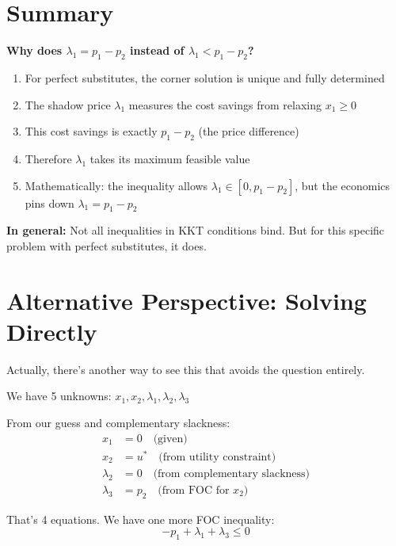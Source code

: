 \documentclass[11pt]{article}
\begin{document}
\section{Summary}

\begin{tcolorbox}[colback=blue!5!white,colframe=blue!75!black,title=The Bottom Line]

\textbf{Why does $\lambda_1 = p_1 - p_2$ instead of $\lambda_1 < p_1 - p_2$?}

\begin{enumerate}
\item For perfect substitutes, the corner solution is unique and fully determined
\item The shadow price $\lambda_1$ measures the cost savings from relaxing $x_1 \geq 0$
\item This cost savings is exactly $p_1 - p_2$ (the price difference)
\item Therefore $\lambda_1$ takes its maximum feasible value

\item Mathematically: the inequality allows $\lambda_1 \in [0, p_1 - p_2]$, but the economics pins down $\lambda_1 = p_1 - p_2$
\end{enumerate}

\textbf{In general:} Not all inequalities in KKT conditions bind. But for this specific problem with perfect substitutes, it does.
\end{tcolorbox}

\section{Alternative Perspective: Solving Directly}

Actually, there's another way to see this that avoids the question entirely.

We have 5 unknowns: $x_1, x_2, \lambda_1, \lambda_2, \lambda_3$

From our guess and complementary slackness:
\begin{align}
x_1 &= 0 \quad \text{(given)} \\
x_2 &= u^* \quad \text{(from utility constraint)} \\
\lambda_2 &= 0 \quad \text{(from complementary slackness)} \\
\lambda_3 &= p_2 \quad \text{(from FOC for $x_2$)}
\end{align}

That's 4 equations. We have one more FOC inequality:
$$-p_1 + \lambda_1 + \lambda_3 \leq 0$$
\end{document}

